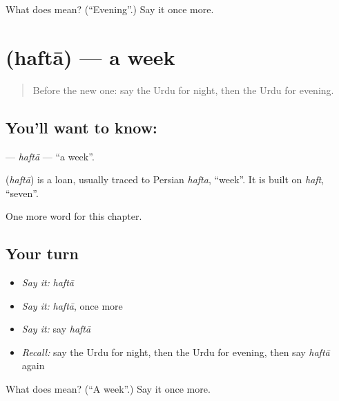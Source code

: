 \begin{tcolorbox}[breakable,colback=teal!4,colframe=teal!35!black,title={Before you move on}]
What does  mean? (\textquotedblleft{}Evening\textquotedblright{}.) Say it once more.
\end{tcolorbox}
\section[\texorpdfstring{\ur{ہفتہ} (haftā)}{ہفتہ (haftā)}]{ (haftā) — a week}

\label{lesson:UR-C75-hafta}



\begin{quote}
Before the new one: say the Urdu for night, then the Urdu for evening.
\end{quote}

\subsection*{You'll want to know: }
\textbf{} — \emph{haftā} — \textquotedblleft{}a week\textquotedblright{}.

\begin{cousinweb}
\textbf{} (\emph{haftā}) is a loan, usually traced to Persian \emph{hafta}, \textquotedblleft{}week\textquotedblright{}. It is built on \emph{haft}, \textquotedblleft{}seven\textquotedblright{}.
\end{cousinweb}

\begin{grammarlens}[title={What you've built}]
One more word for this chapter.
\end{grammarlens}

\subsection*{Your turn}
\begin{itemize}
\raggedright
  \item \emph{Say it:} \emph{haftā}
  \item \emph{Say it:} \emph{haftā}, once more
  \item \emph{Say it:} say \emph{haftā}
  \item \emph{Recall:} say the Urdu for night, then the Urdu for evening, then say \emph{haftā} again
\end{itemize}

\begin{tcolorbox}[breakable,colback=teal!4,colframe=teal!35!black,title={Before you move on}]
What does  mean? (\textquotedblleft{}A week\textquotedblright{}.) Say it once more.
\end{tcolorbox}
